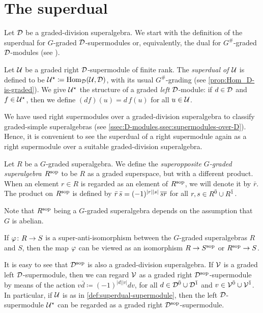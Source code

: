 \section{The superdual}\label{ssec:superdual}

Let $\mathcal{D}$ be a graded-division superalgebra. 
We start with the definition of the superdual for $G$-graded $\mathcal{D}$-supermodules or, equivalently, the dual for $G^\#$-graded $\mathcal{D}$-modules (see \cite[Definition 2.56]{livromicha}). 

\begin{defi}\label{def:superdual-supermodule}
    Let $\mathcal U$ be a graded right $\mathcal{D}$-supermodule of finite rank. 
    The \emph{superdual of $\mathcal U$} is defined to be $\mathcal U^\star \coloneqq \operatorname{Hom}_{\mathcal{D}} (\mathcal U,\mathcal{D})$, with its usual $G^\#$-grading (see \cref{prop:Hom_D-is-graded}). 
    We give $\mathcal U^\star$ the structure of a graded \emph{left} $\mathcal{D}$-module: if $d \in \mathcal{D}$ and $f \in \mathcal U ^\star$, then we define $(df)(u) = d\, f(u)$ for all $u\in \mathcal U$. 
\end{defi}

We have used right supermodules over a graded-division superalgebra to classify graded-simple superalgebras (see \cref{ssec:D-modules,ssec:supermodules-over-D}). 
Hence, it is convenient to see the superdual of a right supermodule again as a right supermodule over a suitable graded-division superalgebra.

\begin{defi}\label{def:superopposite}
    Let $R$ be a $G$-graded superalgebra. 
    We define the \emph{superopposite $G$-graded superalgebra $R^{\mathrm{sop}}$} to be $R$ as a graded superspace, but with a different product. 
    When an element $r\in R$ is regarded as an element of $R^{\mathrm{sop}}$, we will denote it by $\bar r$. 
    The product on $R^{\mathrm{sop}}$ is defined by $\bar r \, \bar {s} = (-1)^{|r||s|} \, \overline{sr}$ for all $r, s \in R^{\bar0} \cup R^{\bar1}$. 
\end{defi}

Note that $R^{\mathrm{sop}}$ being a $G$-graded superalgebra depends on the assumption that $G$ is abelian. 

\begin{remark}\label{rmk:sop-super-anti-iso}
    If $\varphi\colon R \to S$ is a super-anti-isomorphism between the $G$-graded superalgebras $R$ and $S$, then the map $\varphi$ can be viewed as an isomorphism $R\to S^{\mathrm{sop}}$ or $R^{\mathrm{sop}} \to S$.
\end{remark}

It is easy to see that $\mathcal{D}^{\mathrm{sop}}$ is also a graded-division superalgebra. 
If $\mathcal V$ is a graded left $\mathcal{D}$-supermodule, then we can regard $\mathcal V$ as a graded right $\mathcal{D}^{\mathrm{sop}}$-supermodule by means of the action $v \bar d \coloneqq (-1)^{|d||v|} dv$, for all $d\in \mathcal{D}^{\bar0} \cup \mathcal{D}^{\bar1}$ and $v\in \mathcal V^{\bar0} \cup \mathcal V^{\bar1}$. 
In particular, if $\mathcal U$ is as in \cref{def:superdual-supermodule}, then the left $\mathcal{D}$-supermodule $\mathcal U^\star$ can be regarded as a graded right $\mathcal{D}^{\mathrm{sop}}$-supermodule. 

